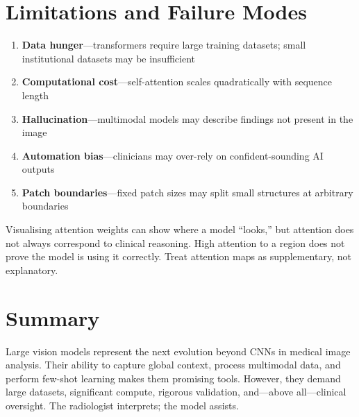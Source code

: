 \section{Limitations and Failure Modes}
\begin{enumerate}
    \item \textbf{Data hunger}---transformers require large training datasets; small institutional datasets may be insufficient
    \item \textbf{Computational cost}---self-attention scales quadratically with sequence length
    \item \textbf{Hallucination}---multimodal models may describe findings not present in the image
    \item \textbf{Automation bias}---clinicians may over-rely on confident-sounding AI outputs
    \item \textbf{Patch boundaries}---fixed patch sizes may split small structures at arbitrary boundaries
\end{enumerate}

\begin{pearlbox}
Visualising attention weights can show where a model ``looks,'' but attention does not always correspond to clinical reasoning. High attention to a region does not prove the model is using it correctly. Treat attention maps as supplementary, not explanatory.
\end{pearlbox}

\section{Summary}
Large vision models represent the next evolution beyond CNNs in medical image analysis. Their ability to capture global context, process multimodal data, and perform few-shot learning makes them promising tools. However, they demand large datasets, significant compute, rigorous validation, and---above all---clinical oversight. The radiologist interprets; the model assists.

\clearpage
